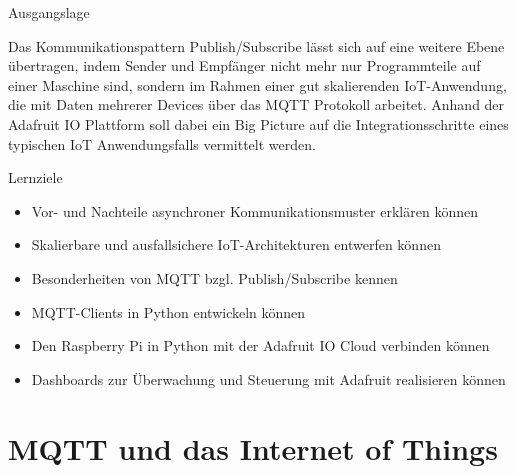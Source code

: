 \begin{frame}{Ausgangslage}

    Das Kommunikationspattern Publish/Subscribe lässt sich auf eine weitere Ebene übertragen, indem Sender und Empfänger nicht mehr nur Programmteile auf einer Maschine sind, sondern  im Rahmen einer gut skalierenden IoT-Anwendung, die mit Daten mehrerer Devices über das MQTT Protokoll arbeitet. Anhand der Adafruit IO Plattform soll dabei ein Big Picture auf die Integrationsschritte eines typischen IoT Anwendungsfalls vermittelt werden.

\end{frame}

\begin{frame}{Lernziele}
    \begin{itemize}
        \item Vor- und Nachteile asynchroner Kommunikationsmuster erklären können
        \item Skalierbare und ausfallsichere IoT-Architekturen entwerfen können
        \item Besonderheiten von MQTT bzgl. Publish/Subscribe kennen
        \item MQTT-Clients in Python entwickeln können
        \item Den Raspberry Pi in Python mit der Adafruit IO Cloud verbinden können
        \item Dashboards zur Überwachung und Steuerung mit Adafruit realisieren können
    \end{itemize}
\end{frame}





\section{MQTT und das Internet of Things}

